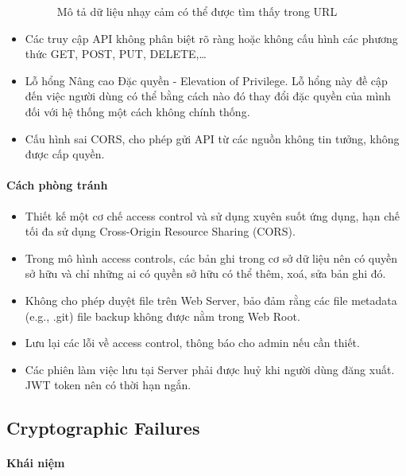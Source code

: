 \begin{itemize}
\begin{figure}[H]
        \caption{Mô tả dữ liệu nhạy cảm có thể được tìm thấy trong URL ~\cite{chap2bib3}}
        \label{fib:DuLieuNhayCam}
    \end{figure}
    \item Các truy cập API không phân biệt rõ ràng hoặc không cấu hình các phương thức GET, POST, PUT, DELETE,…
    \item Lỗ hổng Nâng cao Đặc quyền - Elevation of Privilege. Lỗ hổng này đề cập đến việc người dùng có thể bằng cách nào đó thay đổi đặc quyền của mình đối với hệ thống một cách không chính thống.
    \item Cấu hình sai CORS, cho phép gửi API từ các nguồn không tin tưởng, không được cấp quyền.
\end{itemize}

\paragraph{Cách phòng tránh}

\begin{itemize}
    \item Thiết kế một cơ chế access control và sử dụng xuyên suốt ứng dụng, hạn chế tối đa sử dụng Cross-Origin Resource Sharing (CORS).
    \item Trong mô hình access controls, các bản ghi trong cơ sở dữ liệu nên có quyền sở hữu và chỉ những ai có quyền sở hữu có thể thêm, xoá, sửa bản ghi đó.
    \item Không cho phép duyệt file trên Web Server, bảo đảm rằng các file metadata (e.g., .git) file backup không được nằm trong Web Root.
    \item Lưu lại các lỗi về access control, thông báo cho admin nếu cần thiết.
    \item Các phiên làm việc lưu tại Server phải được huỷ khi người dùng đăng xuất. JWT token nên có thời hạn ngắn.
\end{itemize}

\subsection{Cryptographic Failures ~\cite{chap2bib7}}

\paragraph{Khái niệm ~\cite{chap2bib8}}

